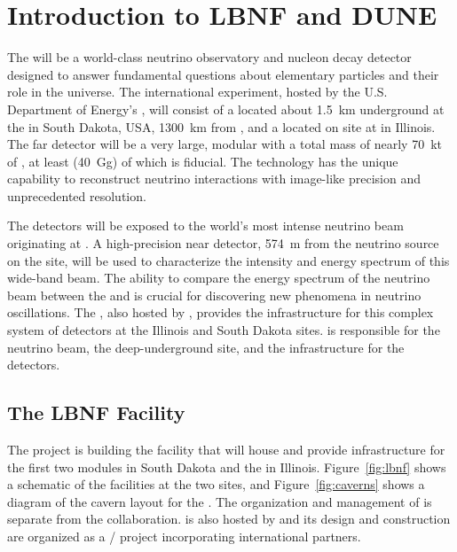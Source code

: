 \chapter{Introduction to LBNF and DUNE}
\label{ch:physics-intro}



The  will be a world-class neutrino observatory and nucleon decay detector designed to answer fundamental questions about elementary particles and their role in the universe. The international  experiment, hosted by the U.S. Department of Energy's , will consist of a  located about \SI{1.5}{km} underground at the  in South Dakota, USA, \SI{1300}{\km} from , and a  located on site at  in Illinois. The far detector will be a very large, modular  with a total mass of nearly \SI{70}{kt} of , at least \fdfiducialmass (\SI{40}{\giga\gram}) of which is fiducial. The  technology 
has the unique capability to reconstruct neutrino interactions with image-like precision and unprecedented resolution. 

The  detectors will be exposed to the world's most intense neutrino beam originating at . A high-precision near detector, \SI{574}{m} from the neutrino source on the  site, will be used to characterize the intensity and energy spectrum of this wide-band beam. The ability to compare the energy spectrum of the neutrino beam between the  and 
is crucial for discovering new phenomena in neutrino oscillations. The , also hosted by , provides the infrastructure for this complex system of detectors at the Illinois and South Dakota sites.  is responsible for the neutrino beam, the deep-underground site, and the infrastructure for the  detectors. 

\section{The LBNF Facility}
\label{sec:physics-intro-lbnf}

The  project is building the facility that will house and provide infrastructure for the first two   modules  in South Dakota  and the  in Illinois.  Figure~\ref{fig:lbnf} shows
a schematic of the facilities at the two sites, and Figure~\ref{fig:caverns} shows a diagram of the cavern layout for the .  
The organization and management of  is separate from the  collaboration.  is also hosted by  and its design and construction are organized as a / project incorporating international partners. 

